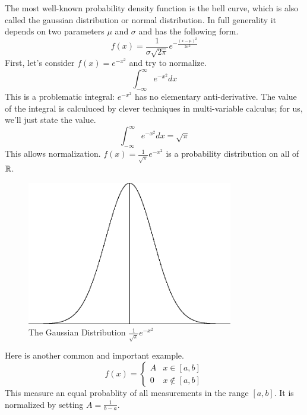 \documentclass[fleqn]{report}
\begin{document}
\begin{example}
The most well-known probability density function is the
bell curve, which is also called the gaussian distribution or
normal distribution. In full generality it depends on two
parameters $\mu$ and $\sigma$ and has the following form.
\begin{equation*}
f(x) = \frac{1}{\sigma \sqrt{2\pi}}
e^{-\frac{(x-\mu)^2}{2\sigma^2}}
\end{equation*}
First, let's consider $f(x) = e^{-x^2}$ and try to normalize.
\begin{equation*}
\int_{-\infty}^\infty e^{-x^2} dx 
\end{equation*}
This is a problematic integral: $e^{-x^2}$ has no elementary
anti-derivative. The value of the integral is calculuced by
clever techniques in multi-variable calculus; for us, we'll
just state the value.
\begin{equation*}
\int_{-\infty}^\infty e^{-x^2} dx = \sqrt{\pi}
\end{equation*}
This allows normalization. $f(x) =
\frac{1}{\sqrt{\pi}} e^{-x^2}$ is a probability distribution on
all of $\mathbb{R}$. 
\end{example}

\begin{figure}[ht]
\centering
\includegraphics[width=9cm]{figure26.eps}
\caption{The Gaussian Distribution $\frac{1}{\sqrt{\pi}}
e^{-x^2}$}
\label{figure-gaussian-distribution}
\end{figure}

\begin{example}
Here is another common and important example.
\begin{equation*}
f(x) = \left\{ \begin{matrix} A & x \in [a,b] \\ 0 & x \notin
[a,b] \end{matrix} \right.
\end{equation*}
This measure an equal probablity of all measurements in the
range $[a,b]$. It is normalized by setting $A = \frac{1}{b-a}$. 
\end{example}
\end{document}
